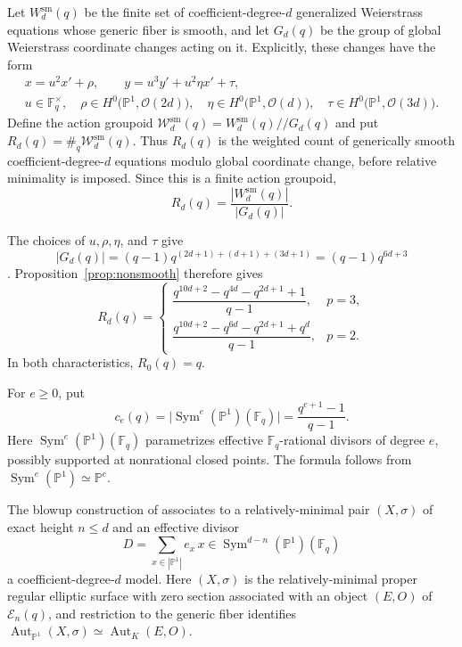 \documentclass[a4paper,12pt]{amsart}
\theoremstyle{definition}
\newcommand{\cW}{\mathcal{W}}
\newcommand{\Fb}{\mathbb{F}}
\newcommand{\sm}{\mathrm{sm}}
\newcommand{\cE}{\mathcal E}
\newcommand{\Pb}{\mathbb{P}}
\newcommand{\Aut}{\operatorname{Aut}}
\newcommand{\Sym}{\operatorname{Sym}}
\begin{document}
Let $W_d^{\sm}(q)$ be the finite set of coefficient-degree-$d$ generalized Weierstrass equations whose generic fiber is smooth, and let $G_d(q)$ be the group of global Weierstrass coordinate changes acting on it.  Explicitly, these changes have the form
\[
\begin{gathered}
x=u^2x'+\rho,
\qquad
y=u^3y'+u^2\eta x'+\tau,\\
u\in\Fb_q^\times,
\quad
\rho\in H^0\bigl(\Pb^1,\mathcal O(2d)\bigr),
\quad
\eta\in H^0\bigl(\Pb^1,\mathcal O(d)\bigr),
\quad
\tau\in H^0\bigl(\Pb^1,\mathcal O(3d)\bigr).
\end{gathered}
\]
Define the action groupoid $\cW_d^{\sm}(q)=W_d^{\sm}(q)\mathbin{//}G_d(q)$ and put $R_d(q)=\#_q\cW_d^{\sm}(q)$.  Thus $R_d(q)$ is the weighted count of generically smooth coefficient-degree-$d$ equations modulo global coordinate change, before relative minimality is imposed.  Since this is a finite action groupoid,
\[
R_d(q)=\frac{|W_d^{\sm}(q)|}{|G_d(q)|}.
\]

The choices of $u,\rho,\eta$, and $\tau$ give
\[
|G_d(q)|
=(q-1)q^{(2d+1)+(d+1)+(3d+1)}
=(q-1)q^{6d+3}
\]
\cite[Sections~4.8--4.9]{dJ2}.  Proposition~\ref{prop:nonsmooth} therefore
gives
\begin{equation}\label{eq:rawall}
R_d(q)
=
\begin{cases}
\dfrac{q^{10d+2}-q^{4d}-q^{2d+1}+1}{q-1},
&p=3,\\[3mm]
\dfrac{q^{10d+2}-q^{6d}-q^{2d+1}+q^d}{q-1},
&p=2.
\end{cases}
\end{equation}
In both characteristics, $R_0(q)=q$.

For $e\geq0$, put
\[
c_e(q)
=
\bigl|\Sym^e(\Pb^1)(\Fb_q)\bigr|
=
\frac{q^{e+1}-1}{q-1}.
\]
Here $\Sym^e(\Pb^1)(\Fb_q)$ parametrizes effective $\Fb_q$-rational divisors of degree $e$, possibly supported at nonrational closed points.  The formula follows from $\Sym^e(\Pb^1)\simeq\Pb^e$.

The blowup construction of \cite[Section~4.11]{dJ2} associates to a relatively-minimal pair $(X,\sigma)$ of exact height $n\leq d$ and an effective divisor
\[
D=\sum_{x\in|\Pb^1|}e_x\,x
\in
\Sym^{d-n}(\Pb^1)(\Fb_q)
\]
a coefficient-degree-$d$ model.  Here $(X,\sigma)$ is the relatively-minimal proper regular elliptic surface with zero section associated with an object $(E,O)$ of $\cE_n(q)$, and restriction to the generic fiber identifies $\Aut_{\Pb^1}(X,\sigma)\simeq\Aut_K(E,O)$.
\end{document}

